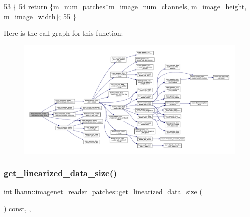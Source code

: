 \begin{DoxyCode}
53                                                       \{
54     \textcolor{keywordflow}{return} \{\hyperlink{classlbann_1_1imagenet__reader__patches_a3380936d3d01d5efc77f0f129891fc65}{m\_num\_patches}*\hyperlink{classlbann_1_1image__data__reader_aab1a440f361521dc7bd583cefe1061f8}{m\_image\_num\_channels}, 
      \hyperlink{classlbann_1_1image__data__reader_a0632efa3deaa9d61e671f741909eb3fe}{m\_image\_height}, \hyperlink{classlbann_1_1image__data__reader_af001f3d1c0f1c580b66988233b3a64f0}{m\_image\_width}\};
55   \}
\end{DoxyCode}
Here is the call graph for this function\+:\nopagebreak
\begin{figure}[H]
\begin{center}
\leavevmode
\includegraphics[width=350pt]{classlbann_1_1imagenet__reader__patches_a4d5c6b9780908d9beb5c6d3f017c38b5_cgraph}
\end{center}
\end{figure}
\mbox{\label{classlbann_1_1imagenet__reader__patches_a09ce692ca31d52424dea5395ad6c8b2b}} 
\subsubsection{\texorpdfstring{get\+\_\+linearized\+\_\+data\+\_\+size()}{get\_linearized\_data\_size()}}
{\footnotesize\ttfamily int lbann\+::imagenet\+\_\+reader\+\_\+patches\+::get\+\_\+linearized\+\_\+data\+\_\+size (\begin{DoxyParamCaption}{ }\end{DoxyParamCaption}) const\hspace{0.3cm}{\ttfamily [inline]}, {\ttfamily [override]}, {\ttfamily [virtual]}}



